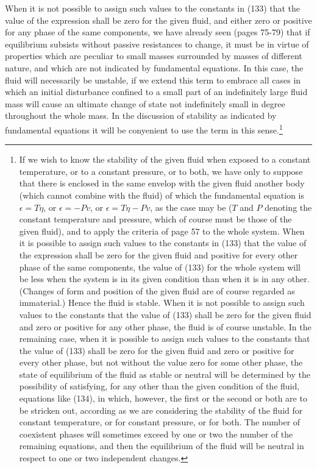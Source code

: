 \documentclass[12pt]{memoir}
\begin{document}
When it is not possible to assign such values to the constants in (133) that the value of the expression shall be zero for the given fluid, and either zero or positive for any phase of the same components, we have already seen (pages 75-79) that if equilibrium subsists without passive resistances to change, it must be in virtue of properties which are peculiar to small masses surrounded by masses of different nature, and which are not indicated by fundamental equations. In this case, the fluid will necessarily be unstable, if we extend this term to embrace all cases in which an initial disturbance confined to a small part of an indefinitely large fluid mass will cause an ultimate change of state not indefinitely small in degree throughout the whole mass. In the discussion of stability as indicated by fundamental equations it will be conyenient to use the term in this sense.\footnote{If we wish to know the stability of the given fluid when exposed to a constant temperature, or to a constant pressure, or to both, we have only to suppose that there is enclosed in the same envelop with the given fluid another body (which cannot combine with the fluid) of which the fundamental equation is $\epsilon= T\eta$, or $\epsilon= - Pv$, or $\epsilon= T\eta - Pv$, as the case may be ($T$ and $P$ denoting the constant temperature and pressure, which of course must be those of the given fluid), and to apply the criteria of page 57 to the whole system.  When it is possible to assign such values to the constants in (133) that the value of the expression shall be zero for the given fluid and positive for every other phase of the same components, the value of (133) for the whole system will be less when the system is in its given condition than when it is in any other. (Changes of form and position of the given fluid are of course regarded as immaterial.) Hence the fluid is stable. When it is not possible to assign such values to the constants that the value of (133) shall be zero for the given fluid and zero or positive for any other phase, the fluid is of course unstable. In the remaining case, when it is possible to assign such values to the constants that the value of (133) shall be zero for the given fluid and zero or positive for every other phase, but not without the value zero for some other phase, the state of equilibrium of the fluid as stable or neutral will be determined by the possibility of satisfying, for any other than the given condition of the fluid, equations like (134), in which, however, the first or the second or both are to be stricken out, according as we are considering the stability of the fluid for constant temperature, or for constant pressure, or for both.  The number of coexistent phases will sometimes exceed by one or two the number of the remaining equations, and then the equilibrium of the fluid will be neutral in respect to one or two independent changes.}
\end{document}
